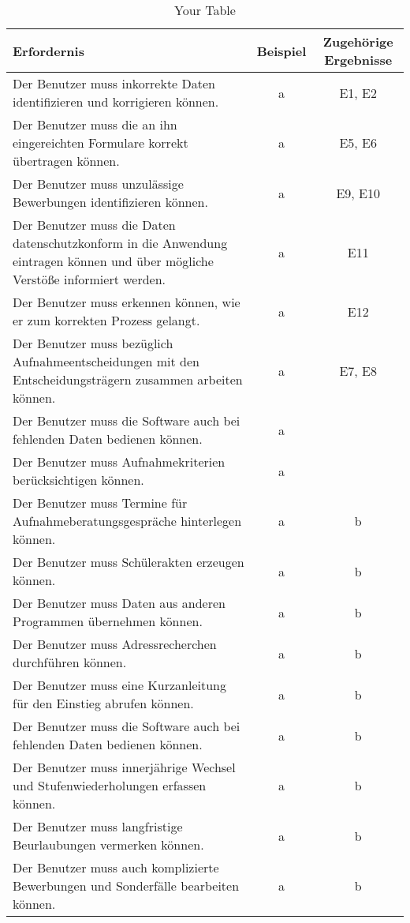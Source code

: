 \begin{landscape}
    \begin{longtable}{p{15cm}cc}
        \caption{Your Table} \label{tab:mytable} \\
        \toprule
        Erfordernis & Beispiel & Zugehörige Ergebnisse \\
        \midrule
            Der Benutzer muss inkorrekte Daten identifizieren und korrigieren können. & a & E1, E2 \\
            Der Benutzer muss die an ihn eingereichten Formulare korrekt übertragen können. & a & E5, E6 \\
            Der Benutzer muss unzulässige Bewerbungen identifizieren können. & a & E9, E10 \\
            Der Benutzer muss die Daten datenschutzkonform in die Anwendung eintragen können und über mögliche Verstöße informiert werden. & a & E11 \\
            Der Benutzer muss erkennen können, wie er zum korrekten Prozess gelangt. & a & E12 \\
            Der Benutzer muss bezüglich Aufnahmeentscheidungen mit den Entscheidungsträgern zusammen arbeiten können. & a & E7, E8 \\
            Der Benutzer muss die Software auch bei fehlenden Daten bedienen können.  & a & \\
            Der Benutzer muss Aufnahmekriterien berücksichtigen können. & a & \\
            Der Benutzer muss Termine für Aufnahmeberatungsgespräche hinterlegen können. & a & b \\
            Der Benutzer muss Schülerakten erzeugen können. & a & b \\
            Der Benutzer muss Daten aus anderen Programmen übernehmen können. & a & b \\
            Der Benutzer muss Adressrecherchen durchführen können. & a & b \\
            Der Benutzer muss eine Kurzanleitung für den Einstieg abrufen können. & a & b \\
            Der Benutzer muss die Software auch bei fehlenden Daten bedienen können. & a & b \\
            Der Benutzer muss innerjährige Wechsel und Stufenwiederholungen erfassen können. & a & b \\
            Der Benutzer muss langfristige Beurlaubungen vermerken können. & a & b \\
            Der Benutzer muss auch komplizierte Bewerbungen und Sonderfälle bearbeiten können. & a & b \\

\end{longtable}
\end{landscape}
